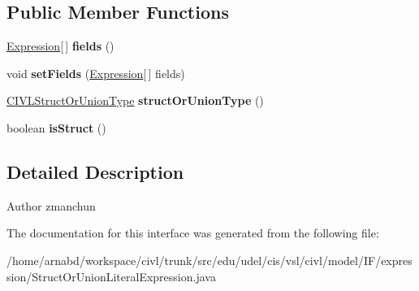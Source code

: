 \subsection*{Public Member Functions}
\begin{DoxyCompactItemize}
\item 
\hypertarget{interfaceedu_1_1udel_1_1cis_1_1vsl_1_1civl_1_1model_1_1IF_1_1expression_1_1StructOrUnionLiteralExpression_a388f4efb35ac2123f530d1fbc0ed599c}{}\hyperlink{interfaceedu_1_1udel_1_1cis_1_1vsl_1_1civl_1_1model_1_1IF_1_1expression_1_1Expression}{Expression}\mbox{[}$\,$\mbox{]} {\bfseries fields} ()\label{interfaceedu_1_1udel_1_1cis_1_1vsl_1_1civl_1_1model_1_1IF_1_1expression_1_1StructOrUnionLiteralExpression_a388f4efb35ac2123f530d1fbc0ed599c}

\item 
\hypertarget{interfaceedu_1_1udel_1_1cis_1_1vsl_1_1civl_1_1model_1_1IF_1_1expression_1_1StructOrUnionLiteralExpression_a1832a13724abc0cf028c67cd51386a20}{}void {\bfseries set\+Fields} (\hyperlink{interfaceedu_1_1udel_1_1cis_1_1vsl_1_1civl_1_1model_1_1IF_1_1expression_1_1Expression}{Expression}\mbox{[}$\,$\mbox{]} fields)\label{interfaceedu_1_1udel_1_1cis_1_1vsl_1_1civl_1_1model_1_1IF_1_1expression_1_1StructOrUnionLiteralExpression_a1832a13724abc0cf028c67cd51386a20}

\item 
\hypertarget{interfaceedu_1_1udel_1_1cis_1_1vsl_1_1civl_1_1model_1_1IF_1_1expression_1_1StructOrUnionLiteralExpression_a7a8b39ab3bd67052bb1b3616de2cbd70}{}\hyperlink{interfaceedu_1_1udel_1_1cis_1_1vsl_1_1civl_1_1model_1_1IF_1_1type_1_1CIVLStructOrUnionType}{C\+I\+V\+L\+Struct\+Or\+Union\+Type} {\bfseries struct\+Or\+Union\+Type} ()\label{interfaceedu_1_1udel_1_1cis_1_1vsl_1_1civl_1_1model_1_1IF_1_1expression_1_1StructOrUnionLiteralExpression_a7a8b39ab3bd67052bb1b3616de2cbd70}

\item 
\hypertarget{interfaceedu_1_1udel_1_1cis_1_1vsl_1_1civl_1_1model_1_1IF_1_1expression_1_1StructOrUnionLiteralExpression_a1985a9454ed15b5553556c04e6312bae}{}boolean {\bfseries is\+Struct} ()\label{interfaceedu_1_1udel_1_1cis_1_1vsl_1_1civl_1_1model_1_1IF_1_1expression_1_1StructOrUnionLiteralExpression_a1985a9454ed15b5553556c04e6312bae}

\end{DoxyCompactItemize}


\subsection{Detailed Description}
\begin{DoxyAuthor}{Author}
zmanchun 
\end{DoxyAuthor}


The documentation for this interface was generated from the following file\+:\begin{DoxyCompactItemize}
\item 
/home/arnabd/workspace/civl/trunk/src/edu/udel/cis/vsl/civl/model/\+I\+F/expression/Struct\+Or\+Union\+Literal\+Expression.\+java\end{DoxyCompactItemize}
